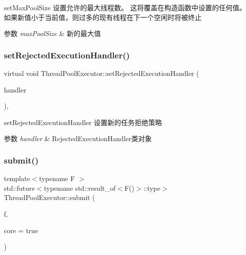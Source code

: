 set\+Max\+Pool\+Size 设置允许的最大线程数。 这将覆盖在构造函数中设置的任何值。 如果新值小于当前值，则过多的现有线程在下一个空闲时将被终止 


\begin{DoxyParams}{参数}
{\em max\+Pool\+Size} & 新的最大值 \\
\hline
\end{DoxyParams}
\mbox{\label{classThreadPoolExecutor_a0a471dc0a68b70d99d8215565a4df688}} 
\subsubsection{\texorpdfstring{set\+Rejected\+Execution\+Handler()}{setRejectedExecutionHandler()}}
{\footnotesize\ttfamily virtual void Thread\+Pool\+Executor\+::set\+Rejected\+Execution\+Handler (\begin{DoxyParamCaption}\item[{\hyperlink{classRejectedExecutionHandler}{Rejected\+Execution\+Handler}}]{handler }\end{DoxyParamCaption})\hspace{0.3cm}{\ttfamily [final]}, {\ttfamily [virtual]}}



set\+Rejected\+Execution\+Handler 设置新的任务拒绝策略 


\begin{DoxyParams}{参数}
{\em handler} & Rejected\+Execution\+Handler类对象 \\
\hline
\end{DoxyParams}
\mbox{\label{classThreadPoolExecutor_a94834ab6bedcc75111524fec4e928b3f}} 
\subsubsection{\texorpdfstring{submit()}{submit()}}
{\footnotesize\ttfamily template$<$typename F $>$ \\
std\+::future$<$typename std\+::result\+\_\+of$<$F()$>$\+::type$>$ Thread\+Pool\+Executor\+::submit (\begin{DoxyParamCaption}\item[{F}]{f,  }\item[{bool}]{core = {\ttfamily true} }\end{DoxyParamCaption})\hspace{0.3cm}{\ttfamily [inline]}}



